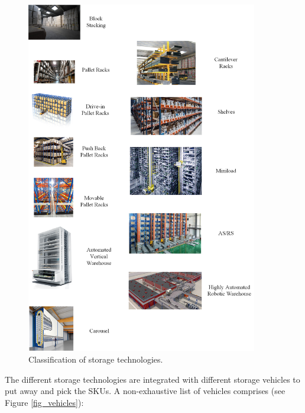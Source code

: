 \begin{figure}[hbt!]
\centering
\includegraphics[width=0.9\textwidth]{SectionWarehouses/design_figures/fig_storageSystem.png}
\captionsetup{type=figure}
\caption{Classification of storage technologies.}
\label{fig_storageSystem}
\end{figure}

\clearpage

The different storage technologies are integrated with different storage vehicles to put away and pick the SKUs. A non-exhaustive list of vehicles comprises (see Figure \ref{fig_vehicles}):

